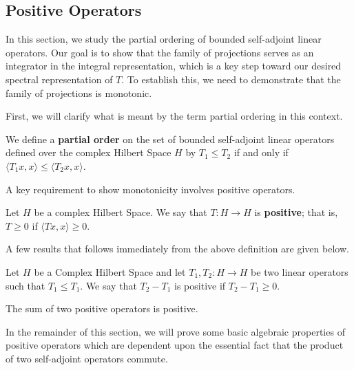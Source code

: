 \subsection{Positive Operators}

In this section, we study the partial ordering of bounded self-adjoint linear operators. Our goal is to show that the family of projections serves as an integrator in the integral representation, which is a key step toward our desired spectral representation of \( T \). To establish this, we need to demonstrate that the family of projections is monotonic.

First, we will clarify what is meant by the term partial ordering in this context.

\begin{definition}
    We define a \textbf{partial order} on the set of bounded self-adjoint linear operators defined over the complex Hilbert Space \( H  \) by \( {T}_{1} \leq {T}_{2}  \) if and only if \( \langle {T}_{1}x  , x   \rangle \leq \langle {T}_{2} x  ,  x  \rangle  \).
\end{definition}

A key requirement to show monotonicity involves positive operators.

\begin{definition}
    Let \( H  \) be a complex Hilbert Space. We say that \( T: H \to  H \) is \textbf{positive}; that is, \( T \geq  0  \) if \( \langle Tx  ,  x  \rangle \geq 0  \).
\end{definition}

A few results that follows immediately from the above definition are given below.

\begin{lemma}
    Let \( H  \) be a Complex Hilbert Space and let \( {T}_{1}, {T}_{2} : H \to H  \) be two linear operators such that \( {T}_{1} \leq {T}_{1} \). We say that \( {T}_{2} - {T}_{1}  \) is positive if \( {T}_{2} - {T}_{1} \geq 0  \). 
\end{lemma}

\begin{lemma}
    The sum of two positive operators is positive.
\end{lemma}

In the remainder of this section, we will prove some basic algebraic properties of positive operators which are dependent upon the essential fact that the product of two self-adjoint operators commute.

